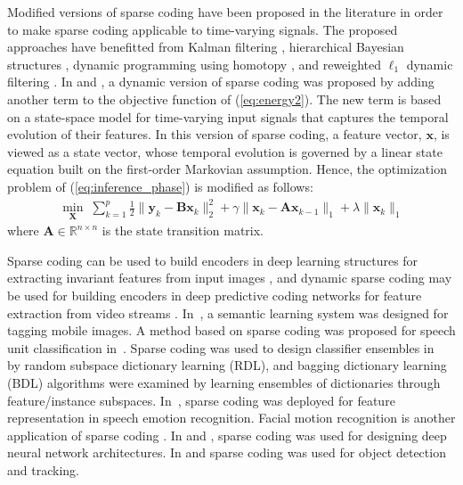 \documentclass[journal]{IEEEtran}
\def\x{{\mathbf x}}
\def\y{{\mathbf y}}
\def\A{{\mathbf A}}
\def\B{{\mathbf B}}
\def\X{{\mathbf X}}
\begin{document}
Modified versions of sparse coding have been proposed in the literature in order to make sparse coding applicable to time-varying signals. The proposed approaches have benefitted from Kalman filtering \cite{Vaswani2008}, hierarchical Bayesian structures \cite{Karseras2013}, dynamic programming using homotopy \cite{Charles2011}, and reweighted $\ell_1$ dynamic filtering \cite{Charles2013}. In \cite{Chalasani2013} and \cite{Chalasani2014}, a dynamic version of sparse coding was proposed by adding another term to the objective function of (\ref{eq:energy2}). The new term is based on a state-space model for time-varying input signals that captures the temporal evolution of their features. In this version of sparse coding, a feature vector, $\x$, is viewed as a state vector, whose temporal evolution is governed by a linear state equation built on the first-order Markovian assumption. Hence, the optimization problem of (\ref{eq:inference_phase}) is modified as follows:
    \begin{eqnarray} \label{eq:inference_phase2}
    {\underset {\X}{\min}}  \;
    \sum_{k=1}^p \frac{1}{2} \| \y_k-\B \x_k \|^2_2 + \gamma \| \x_k-\A \x_{k-1} \|_1 + \lambda \| \x_k \|_1
    \end{eqnarray}
where $\A \in \mathbb{R}^{n \times n}$ is the state transition matrix. 

Sparse coding can be used to build encoders in deep learning structures for extracting invariant features from input images \cite{Gregor2010}, and dynamic sparse coding may be used for building encoders in deep predictive coding networks for feature extraction from video streams \cite{Chalasani2013, Principe2014}. In~\cite{Tao2017}, a semantic learning system was designed for tagging mobile images. A method based on sparse coding was proposed for speech unit classification in~\cite{Sharma2018}. Sparse coding was used to design classifier ensembles in~\cite{Tuysuzoglu2018} by random subspace dictionary learning (RDL), and bagging dictionary learning (BDL) algorithms were examined by learning ensembles of dictionaries through feature/instance subspaces. In~\cite{TorresBoza2018}, sparse coding was deployed for feature representation in speech emotion recognition. Facial motion recognition is another application of sparse coding \cite{Sunitha2017}. In \cite{Hu2018} and \cite{Murray2018}, sparse coding was used for designing deep neural network architectures. In \cite{Oguslu2018} and \cite{Qi2018} sparse coding was used for object detection and tracking.
\end{document}
